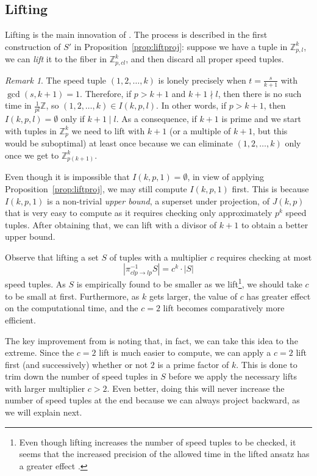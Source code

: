 \documentclass[11pt]{amsart}
\newcommand{\Z}{\mathbb{Z}}
\newcommand{\onetok}{(1, 2, \dots, k)}
\theoremstyle{definition}
\theoremstyle{remark}
\newtheorem{remark}[theorem]{Remark}
\begin{document}
\subsection{Lifting}
\label{subsec:efflift}
Lifting is the main innovation of \cite{Trakulthongchai}. 
The process is described in the first construction of $S'$ in Proposition~\ref{prop:liftproj}: suppose we have a tuple in $\Z^k_{p,l}$,
we can \emph{lift} it to the fiber in $\Z^k_{p,cl}$, and then discard all proper speed tuples.

\begin{remark}
\label{rem:tightset}
    The speed tuple $\onetok$ is lonely precisely when $t=\frac{s}{k+1}$ with $\gcd(s,k+1)=1$. 
    Therefore, if $p>k+1$ and $k+1\nmid l$, then there is no such time in $\frac{1}{pl}\Z$,
    so $\onetok\in I(k,p,l)$. 
    In other words, if $p>k+1$, then $I(k,p,l)=\emptyset$ only if $k+1\mid l$. 
    As a consequence, if $k+1$ is prime and we start with tuples in $\Z^k_{p}$
    we need to lift with $k+1$ (or a multiple of $k+1$, but this would be suboptimal)
    at least once because we can eliminate $\onetok$ only once we get to $\Z^{k}_{p(k+1)}$.
\end{remark}

Even though it is impossible that $I(k,p,1)=\emptyset$, in view of applying Proposition~\ref{prop:liftproj}, 
we may still compute $I(k,p,1)$ first.
This is because $I(k, p, 1)$ is a non-trivial \emph{upper bound}, a superset under projection, of $J(k, p)$ 
that is very easy to compute as it requires checking only approximately $p^k$ speed tuples.
After obtaining that, we can lift with a divisor of $k+1$ to obtain a better upper bound.

Observe that lifting a set $S$ of tuples with a multiplier $c$ requires checking at most
\[ \left| \pi^{-1}_{clp \to lp} S \right| = c^k\cdot|S| \]
speed tuples.
As $S$ is empirically found to be smaller as we lift\footnote{
  Even though lifting increases the number of speed tuples to be checked,
  it seems that the increased precision of the allowed time in the lifted ansatz has a greater effect \cite{Trakulthongchai}.
}, we should take $c$ to be small at first. 
Furthermore, as $k$ gets larger, the value of $c$ has greater effect on the computational time, 
and the $c=2$ lift becomes comparatively more efficient.

The key improvement from \cite{Trakulthongchai} is noting that, in fact, we can take this idea to the extreme.
Since the $c=2$ lift is much easier to compute, 
we can apply a $c=2$ lift first (and successively) whether or not $2$ is a prime factor of $k$.
This is done to trim down the number of speed tuples in $S$ before we apply the necessary lifts with larger multiplier $c>2$.
Even better, doing this will never increase the number of speed tuples at the end because we can always project backward,
as we will explain next.
 
\end{document}
